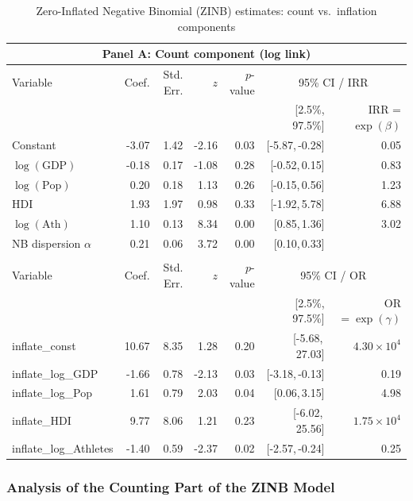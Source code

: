 \documentclass[11pt,twoside]{article}
\numberwithin{Theorem}{section}
\numberwithin{Definition}{section}
\numberwithin{Lemma}{section}
\numberwithin{Algorithm}{section}
\numberwithin{equation}{section}
\begin{document}
\begin{table}[H]
\centering
\caption{Zero-Inflated Negative Binomial (ZINB) estimates: count vs.\ inflation components}
\label{tab:zinb_coef}
\begin{tabular}{lrrrrrr}
\toprule
\multicolumn{7}{c}{\textbf{Panel A: Count component (log link)}}\\
\midrule
Variable & Coef. & Std. Err. & $z$ & $p$-value & \multicolumn{2}{c}{95\% CI / IRR} \\
\cmidrule(lr){6-7}
 &  &  &  &  & [2.5\%, 97.5\%] & IRR = $\exp(\beta)$ \\
\midrule
Constant             &  -3.07 & 1.42 & -2.16 & 0.03 & [-5.87,\,-0.28] & 0.05 \\
$\log(\mathrm{GDP})$ &  -0.18 & 0.17 & -1.08 & 0.28 & [-0.52,\,0.15]  & 0.83 \\
$\log(\mathrm{Pop})$ &   0.20 & 0.18 &  1.13 & 0.26 & [-0.15,\,0.56]  & 1.23 \\
$\mathrm{HDI}$       &   1.93 & 1.97 &  0.98 & 0.33 & [-1.92,\,5.78]  & 6.88 \\
$\log(\mathrm{Ath})$ &   1.10 & 0.13 &  8.34 & 0.00 & [0.85,\,1.36]   & 3.02 \\
\midrule
NB dispersion $\alpha$ & 0.21 & 0.06 & 3.72 & 0.00 & [0.10,\,0.33] & \\
\addlinespace[2pt]
\multicolumn{7}{c}{\textbf{Panel B: Inflation component (logit link)}}\\
\midrule
Variable & Coef. & Std. Err. & $z$ & $p$-value & \multicolumn{2}{c}{95\% CI / OR} \\
\cmidrule(lr){6-7}
 &  &  &  &  & [2.5\%, 97.5\%] & OR $=\exp(\gamma)$ \\
\midrule
inflate\_const           & 10.67 & 8.35 &  1.28 & 0.20 & [-5.68,\,27.03] & $4.30\times 10^{4}$ \\
inflate\_log\_GDP        & -1.66 & 0.78 & -2.13 & 0.03 & [-3.18,\,-0.13] & 0.19 \\
inflate\_log\_Pop        &  1.61 & 0.79 &  2.03 & 0.04 & [0.06,\,3.15]   & 4.98 \\
inflate\_HDI             &  9.77 & 8.06 &  1.21 & 0.23 & [-6.02,\,25.56] & $1.75\times 10^{4}$ \\
inflate\_log\_Athletes   & -1.40 & 0.59 & -2.37 & 0.02 & [-2.57,\,-0.24] & 0.25 \\
\bottomrule
\end{tabular}
\end{table}

\subsubsection{Analysis of the Counting Part of the ZINB Model}
\end{document}
